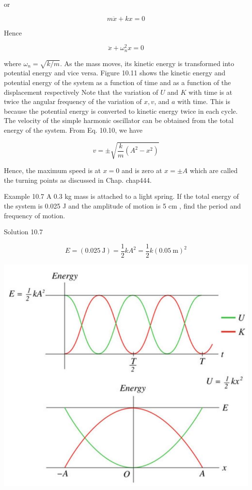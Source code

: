 \documentclass[10pt]{article}
\begin{document}
or

$$
m \ddot{x}+k x=0
$$

Hence

$$
\ddot{x}+\omega_{n}^{2} x=0
$$

where $\omega_{n}=\sqrt{k / m}$. As the mass moves, its kinetic energy is transformed into potential energy and vice versa. Figure 10.11 shows the kinetic energy and potential energy of the system as a function of time and as a function of the displacement respectively Note that the variation of $U$ and $K$ with time is at twice the angular frequency of the variation of $x, v$, and $a$ with time. This is because the potential energy is converted to kinetic energy twice in each cycle. The velocity of the simple harmonic oscillator can be obtained from the total energy of the system. From Eq. 10.10, we have

$$
v= \pm \sqrt{\frac{k}{m}\left(A^{2}-x^{2}\right)}
$$

Hence, the maximum speed is at $x=0$ and is zero at $x= \pm A$ which are called the turning points as discussed in Chap. chap444.

Example 10.7 A 0.3 kg mass is attached to a light spring. If the total energy of the system is 0.025 J and the amplitude of motion is 5 cm , find the period and frequency of motion.

Solution 10.7

$$
E=(0.025 \mathrm{~J})=\frac{1}{2} k A^{2}=\frac{1}{2} k(0.05 \mathrm{~m})^{2}
$$

\begin{center}
\includegraphics[max width=\textwidth]{2024_09_13_db1f357d2aad0a03eb2eg-168}
\end{center}
\end{document}
